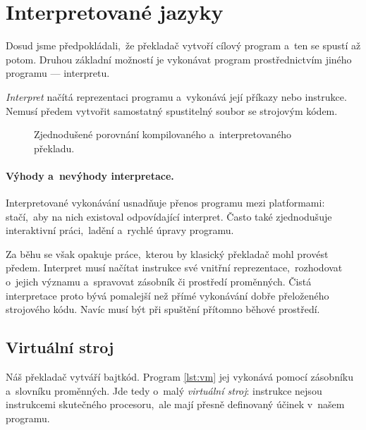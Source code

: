 \section{Interpretované jazyky}\label{sec:interpretovane-jazyky}

Dosud jsme předpokládali,~že překladač vytvoří cílový program a~ten se spustí až potom. Druhou základní možností je vykonávat program prostřednictvím jiného programu --- interpretu.

\emph{Interpret} načítá reprezentaci programu a~vykonává její příkazy nebo instrukce. Nemusí předem vytvořit samostatný spustitelný soubor se strojovým kódem.

\begin{figure}[h]
    \centering
    
    \caption{Zjednodušené porovnání kompilovaného a~interpretovaného překladu.}
    \label{fig:kompilace-interpretace}
\end{figure}


\paragraph{Výhody a~nevýhody interpretace.}

Interpretované vykonávání usnadňuje přenos programu mezi platformami: stačí,~aby na nich existoval odpovídající interpret. Často také zjednodušuje interaktivní práci,~ladění a~rychlé úpravy programu.

Za běhu se však opakuje práce,~kterou by klasický překladač mohl provést předem. Interpret musí načítat instrukce své vnitřní reprezentace,~rozhodovat o~jejich významu a~spravovat zásobník či prostředí proměnných. Čistá interpretace proto bývá pomalejší než přímé vykonávání dobře přeloženého strojového kódu. Navíc musí být při spuštění přítomno běhové prostředí.

\subsection{Virtuální stroj}

Náš překladač vytváří bajtkód. Program \ref{lst:vm} jej vykonává pomocí zásobníku a~slovníku proměnných. Jde tedy o~malý \emph{virtuální stroj}: instrukce nejsou instrukcemi skutečného procesoru,~ale mají přesně definovaný účinek v~našem programu.

